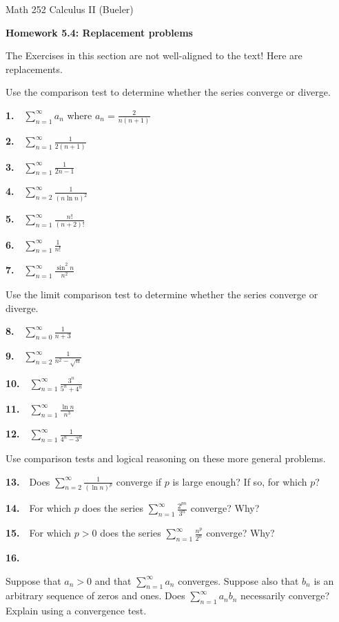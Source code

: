 \documentclass[12pt]{amsart}
\newcommand{\ds}{\displaystyle}
\begin{document}
\scriptsize \noindent Math 252 Calculus II (Bueler)
\normalsize

\Large
\bigskip
\centerline{\textbf{Homework 5.4: Replacement problems}}
\medskip
\normalsize

\thispagestyle{empty}

\bigskip

The Exercises in this section are not well-aligned to the text!  Here are replacements.

\bigskip
\noindent Use the comparison test to determine whether the series converge or diverge.

\newcommand{\pr}[1]{\bigskip \textbf{#1.} \,\,}

\pr{1} $\ds \sum_{n=1}^\infty a_n$ where $\ds a_n = \frac{2}{n(n+1)}$

\pr{2} $\ds \sum_{n=1}^\infty \frac{1}{2(n+1)}$

\pr{3} $\ds \sum_{n=1}^\infty \frac{1}{2n - 1}$

\pr{4} $\ds \sum_{n=2}^\infty \frac{1}{(n\ln n)^2}$

\pr{5} $\ds \sum_{n=1}^\infty \frac{n!}{(n+2)!}$

\pr{6} $\ds \sum_{n=1}^\infty \frac{1}{n!}$

\pr{7} $\ds \sum_{n=1}^\infty \frac{\sin^2 n}{n^2}$

\bigskip
\noindent Use the limit comparison test to determine whether the series converge or diverge.

\pr{8} $\ds \sum_{n=0}^\infty \frac{1}{n+3}$

\pr{9} $\ds \sum_{n=2}^\infty \frac{1}{n^2 - \sqrt{n}}$

\pr{10} $\ds \sum_{n=1}^\infty \frac{3^n}{5^n + 4^n}$

\pr{11} $\ds \sum_{n=1}^\infty \frac{\ln n}{n^3}$

\pr{12} $\ds \sum_{n=1}^\infty \frac{1}{4^n - 3^n}$

\bigskip
\noindent Use comparison tests and logical reasoning on these more general problems.

\pr{13} Does $\ds \sum_{n=2}^\infty \frac{1}{(\ln n)^p}$ converge if $p$ is large enough?  If so, for which $p$?

\pr{14} For which $p$ does the series $\ds \sum_{n=1}^\infty \frac{2^{pn}}{3^n}$ converge?  Why?

\pr{15} For which $p>0$ does the series $\ds \sum_{n=1}^\infty \frac{n^p}{2^n}$ converge?  Why?

\pr{16} \begin{minipage}[t]{5.5in} Suppose that $a_n>0$ and that $\ds \sum_{n=1}^\infty a_n$ converges.  Suppose also that $b_n$ is an arbitrary sequence of zeros and ones. Does $\ds \sum_{n=1}^\infty a_n b_n$ necessarily converge?  Explain using a convergence test. \end{minipage}
\end{document}
